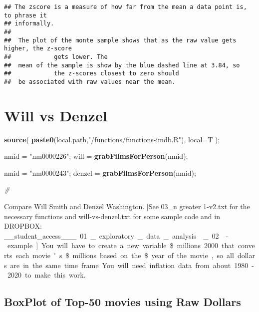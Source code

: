 \documentclass[
]{article}
\newenvironment{Shaded}{\begin{snugshade}}{\end{snugshade}}
\newcommand{\CommentTok}[1]{\textcolor[rgb]{0.56,0.35,0.01}{\textit{#1}}}
\newcommand{\DataTypeTok}[1]{\textcolor[rgb]{0.13,0.29,0.53}{#1}}
\newcommand{\KeywordTok}[1]{\textcolor[rgb]{0.13,0.29,0.53}{\textbf{#1}}}
\newcommand{\NormalTok}[1]{#1}
\newcommand{\StringTok}[1]{\textcolor[rgb]{0.31,0.60,0.02}{#1}}
\begin{document}
\begin{verbatim}
## The zscore is a measure of how far from the mean a data point is, to phrase it 
## informally. 
##            
##  The plot of the monte sample shows that as the raw value gets higher, the z-score 
##            gets lower. The 
##  mean of the sample is show by the blue dashed line at 3.84, so 
##            the z-scores closest to zero should 
##  be associated with raw values near the mean.
\end{verbatim}

\hypertarget{will-vs-denzel}{%
\section{Will vs Denzel}\label{will-vs-denzel}}

\begin{Shaded}
\begin{Highlighting}[]
\KeywordTok{source}\NormalTok{( }\KeywordTok{paste0}\NormalTok{(local.path,}\StringTok{"/functions/functions-imdb.R"}\NormalTok{), }\DataTypeTok{local=}\NormalTok{T );}

\NormalTok{nmid =}\StringTok{ "nm0000226"}\NormalTok{;}
\NormalTok{will =}\StringTok{ }\KeywordTok{grabFilmsForPerson}\NormalTok{(nmid);}

\NormalTok{nmid =}\StringTok{ "nm0000243"}\NormalTok{;}
\NormalTok{denzel =}\StringTok{ }\KeywordTok{grabFilmsForPerson}\NormalTok{(nmid);}

\CommentTok{#}
\end{Highlighting}
\end{Shaded}

Compare Will Smith and Denzel Washington. {[}See 03\_n greater 1-v2.txt
for the necessary functions and will-vs-denzel.txt for some sample code
and in DROPBOX:
\_\_student\_access\_\_\unit\_01\_exploratory\_data\_analysis\week\_02\imdb-example
{]} You will have to create a new variable \$millions.2000 that converts
each movie's \$millions based on the \$year of the movie, so all dollars
are in the same time frame. You will need inflation data from about
1980-2020 to make this work.

\hypertarget{boxplot-of-top-50-movies-using-raw-dollars}{%
\subsection{BoxPlot of Top-50 movies using Raw
Dollars}\label{boxplot-of-top-50-movies-using-raw-dollars}}
\end{document}
